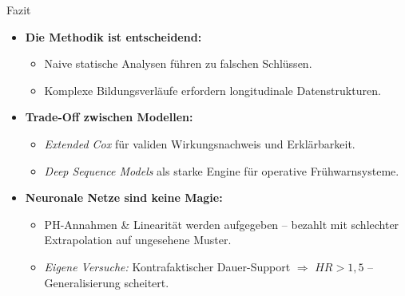 \documentclass[12pt]{beamer}
\begin{document}
\begin{frame}{Fazit}
    \footnotesize
    \begin{itemize}
        \item \textbf{Die Methodik ist entscheidend:} 
        \begin{itemize}
            \item Naive statische Analysen führen zu falschen Schlüssen.
            \item Komplexe Bildungsverläufe erfordern longitudinale Datenstrukturen.
        \end{itemize}
        \item \textbf{Trade-Off zwischen Modellen:}
        \begin{itemize}
            \item \textit{Extended Cox} für validen Wirkungsnachweis und Erklärbarkeit.
            \item \textit{Deep Sequence Models} als starke Engine für operative Frühwarnsysteme.
        \end{itemize}
        \item \textbf{Neuronale Netze sind keine Magie:}
        \begin{itemize}
            \item PH-Annahmen \& Linearität werden aufgegeben -- bezahlt mit schlechter Extrapolation auf ungesehene Muster.
            \item \textit{Eigene Versuche:} Kontrafaktischer Dauer-Support $\Rightarrow$ $HR > 1{,}5$ -- Generalisierung scheitert.
        \end{itemize}
    \end{itemize}
\end{frame}
\end{document}
